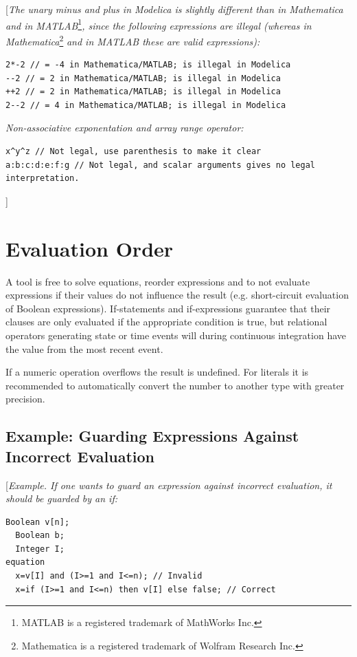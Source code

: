 \documentclass[10pt,a4paper]{report}
\def\Mcommentbegin#1{{[}\emph{#1}}
\def\Mcommentend#1{\emph{#1}{]}}
\def\Mcommentmid#1{\emph{#1}}
\def\doublelabel#1{\label{#1}\hypertarget{#1}{}}
\begin{document}
\Mcommentbegin{The unary minus and plus in Modelica is slightly different than
in Mathematica and in MATLAB}\footnote{MATLAB is a registered trademark
  of MathWorks Inc.}\Mcommentmid{, since the following expressions are illegal
(whereas in Mathematica}\footnote{Mathematica is a registered trademark
  of Wolfram Research Inc.} \Mcommentmid{and in MATLAB these are valid
expressions):}
\begin{lstlisting}[language=modelica]
2*-2 // = -4 in Mathematica/MATLAB; is illegal in Modelica
--2 // = 2 in Mathematica/MATLAB; is illegal in Modelica
++2 // = 2 in Mathematica/MATLAB; is illegal in Modelica
2--2 // = 4 in Mathematica/MATLAB; is illegal in Modelica
\end{lstlisting}
\emph{Non-associative exponentation and array range operator:}
\begin{lstlisting}[language=modelica]
x^y^z // Not legal, use parenthesis to make it clear
a:b:c:d:e:f:g // Not legal, and scalar arguments gives no legal
interpretation.
\end{lstlisting}
\Mcommentend{}

\section{Evaluation Order}
\doublelabel{evaluation-order}

A tool is free to solve equations, reorder expressions and to not
evaluate expressions if their values do not influence the result (e.g.
short-circuit evaluation of Boolean expressions). If-statements and
if-expressions guarantee that their clauses are only evaluated if the
appropriate condition is true, but relational operators generating state
or time events will during continuous integration have the value from
the most recent event.

If a numeric operation overflows the result is undefined. For literals
it is recommended to automatically convert the number to another type
with greater precision.

\subsection{Example: Guarding Expressions Against Incorrect Evaluation}

{[}\emph{Example. If one wants to guard an expression against incorrect
evaluation, it should be guarded by an if:}

\begin{lstlisting}[language=modelica]
Boolean v[n];
  Boolean b;
  Integer I;
equation
  x=v[I] and (I>=1 and I<=n); // Invalid
  x=if (I>=1 and I<=n) then v[I] else false; // Correct
\end{lstlisting}
\end{document}
